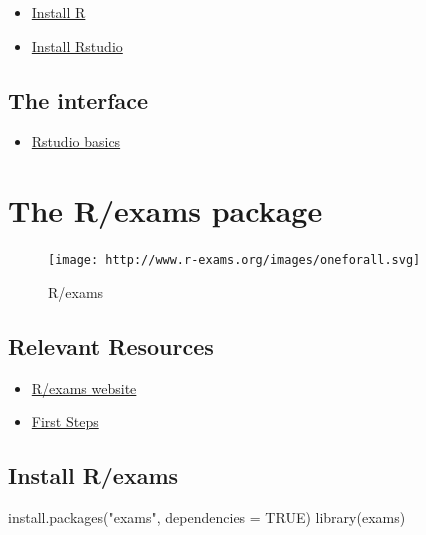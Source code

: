 \documentclass[
]{article}
\newenvironment{Shaded}{\begin{snugshade}}{\end{snugshade}}
\newcommand{\AttributeTok}[1]{\textcolor[rgb]{0.77,0.63,0.00}{#1}}
\newcommand{\ConstantTok}[1]{\textcolor[rgb]{0.00,0.00,0.00}{#1}}
\newcommand{\FunctionTok}[1]{\textcolor[rgb]{0.00,0.00,0.00}{#1}}
\newcommand{\NormalTok}[1]{#1}
\newcommand{\StringTok}[1]{\textcolor[rgb]{0.31,0.60,0.02}{#1}}
\providecommand{\tightlist}{%
  \setlength{\itemsep}{0pt}\setlength{\parskip}{0pt}}
\begin{document}
\begin{itemize}
\tightlist
\item
  \href{https://www.google.com/search?rls=en\&q=how+to+install+r\&ie=UTF-8\&oe=UTF-8}{Install
  R}
\item
  \href{https://www.google.com/search?rls=en\&q=how+to+install+rstudio\&ie=UTF-8\&oe=UTF-8}{Install
  Rstudio}
\end{itemize}

\hypertarget{the-interface}{%
\subsection{The interface}\label{the-interface}}

\begin{itemize}
\tightlist
\item
  \href{https://bookdown.org/gary_a_napier/induction_-_introduction_to_r/rstudio-interface.html}{Rstudio
  basics}
\end{itemize}

\hypertarget{the-rexams-package}{%
\section{The R/exams package}\label{the-rexams-package}}

\begin{figure}
\centering
\texttt{[image: http://www.r-exams.org/images/oneforall.svg]}
\caption{R/exams}
\end{figure}

\hypertarget{relevant-resources}{%
\subsection{Relevant Resources}\label{relevant-resources}}

\begin{itemize}
\tightlist
\item
  \href{http://www.r-exams.org}{R/exams website}
\item
  \href{http://www.r-exams.org/tutorials/first_steps/}{First Steps}
\end{itemize}

\hypertarget{install-rexams}{%
\subsection{Install R/exams}\label{install-rexams}}

\begin{Shaded}
\begin{Highlighting}[]
\FunctionTok{install.packages}\NormalTok{(}\StringTok{"exams"}\NormalTok{, }\AttributeTok{dependencies =} \ConstantTok{TRUE}\NormalTok{)}
\FunctionTok{library}\NormalTok{(exams)}
\end{Highlighting}
\end{Shaded}
\end{document}
